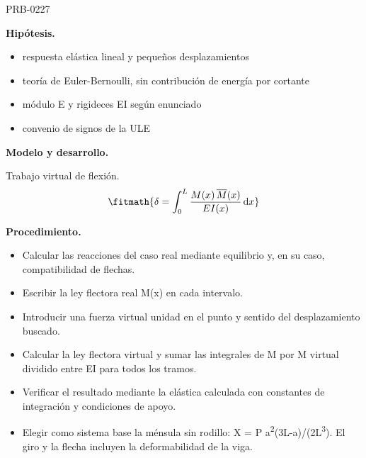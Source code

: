 \begin{studiumworked}{PRB-0227}
\begin{minipage}{\linewidth}
%
\fi
\fi
\endgroup
\par\nopagebreak
{}
\end{minipage}\par\medskip

\textbf{Hipótesis.}\begin{itemize}\item respuesta elástica lineal y pequeños desplazamientos
\item teoría de Euler-Bernoulli, sin contribución de energía por cortante
\item módulo E y rigideces EI según enunciado
\item convenio de signos de la ULE\end{itemize}

\textbf{Modelo y desarrollo.}

Trabajo virtual de flexión.\[\fitmath{\delta = \int_{0}^{L}\frac{M(x)\,\overline{M}(x)}{E I(x)}\,\mathrm{d}x}\]

\textbf{Procedimiento.}\begin{itemize}\item Calcular las reacciones del caso real mediante equilibrio y, en su caso, compatibilidad de flechas.
\item Escribir la ley flectora real M(x) en cada intervalo.
\item Introducir una fuerza virtual unidad en el punto y sentido del desplazamiento buscado.
\item Calcular la ley flectora virtual y sumar las integrales de M por M virtual dividido entre EI para todos los tramos.
\item Verificar el resultado mediante la elástica calculada con constantes de integración y condiciones de apoyo.
\item Elegir como sistema base la ménsula sin rodillo: X = P a\textsuperscript{2}(3L-a)/(2L\textsuperscript{3}). El giro y la flecha incluyen la deformabilidad de la viga.\end{itemize}


\end{studiumworked}
